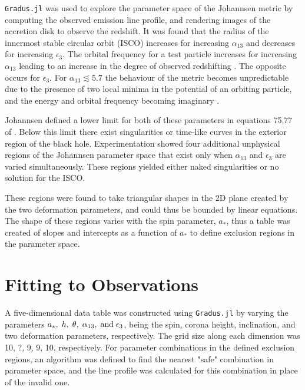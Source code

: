 \documentclass[fleqn,usenatbib]{mnras}
\begin{document}
\verb|Gradus.jl| \cite{baker_gradusjl_2025} was used to explore the parameter space of the Johannsen metric by computing the observed emission line profile, and rendering images of the accretion disk to observe the redshift. It was found that the radius of the innermost stable circular orbit (ISCO) increases for increasing $\alpha_{13}$ and decreases for increasing $\epsilon_{3}$. The orbital frequency for a test particle increases for increasing $\alpha_{13}$ leading to an increase in the degree of observed redshifting \cite{johannsen_regular_2013}. The opposite occurs for $\epsilon_{3}$. For $\alpha_{13}\lesssim 5.7$ the behaviour of the metric becomes unpredictable due to the presence of two local minima in the potential of an orbiting particle, and the energy and orbital frequency becoming imaginary \cite{johannsen_regular_2013}.

Johannsen defined a lower limit for both of these parameters in equations 75,77 of \cite{johannsen_regular_2013}. Below this limit there exist singularities or time-like curves in the exterior region of the black hole. Experimentation showed four additional unphysical regions of the Johannsen parameter space that exist only when $\alpha_{13}$ and $\epsilon_{3}$ are varied simultaneously. These regions yielded either naked singularities or no solution for the ISCO.

These regions were found to take triangular shapes in the 2D plane created by the two deformation parameters, and could thus be bounded by linear equations. The shape of these regions varies with the spin parameter, $a_*$, thus a table was created of slopes and intercepts as a function of $a_*$ to define exclusion regions in the parameter space. 

\vspace{-2em}
\section{Fitting to Observations}

A five-dimensional data table was constructed using \verb|Gradus.jl| by varying the parameters $a_*,\;h,\;\theta,\;\alpha_{13},\;{\rm and}\;\epsilon_{3}$, being the spin, corona height, inclination, and two deformation parameters, respectively. The grid size along each dimension was 10, ?, 9, 9, 10, respectively. For parameter combinations in the defined exclusion regions, an algorithm was defined to find the nearest "safe" combination in parameter space, and the line profile was calculated for this combination in place of the invalid one.
\end{document}
